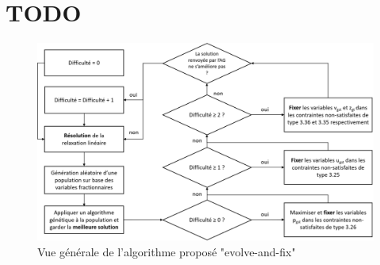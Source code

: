 \vspace*{1.2cm}

\section{TODO}

\begin{figure}[h!]
    \begin{center}
        \includegraphics[width=\textwidth]{imgs/evolveandfix.png}\\
        Vue générale de l'algorithme proposé "evolve-and-fix"
    \end{center}
\end{figure}